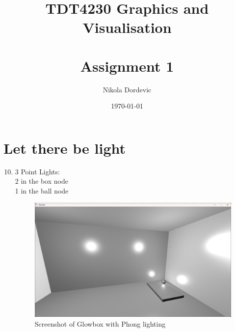 \documentclass[11pt,a4paper]{report}
\title{TDT4230 Graphics and Visualisation \\\\ Assignment 1}
\author{Nikola Dordevic}
\date{\today}
\begin{document}
\section{Let there be light}
\begin{enumerate}[label=(\alph*)]\setcounter{enumi}{9}
	\item 3 Point Lights: \\ \hspace*{5mm} 2 in the box node \\ \hspace*{5mm} 1 in the ball node
	
	\begin{figure}[h]
		\centering
		\includegraphics[width=\textwidth]{images/task1j.png}
		\caption{Screenshot of Glowbox with Phong lighting}
	\end{figure}
\end{enumerate}

\clearpage
\end{document}

